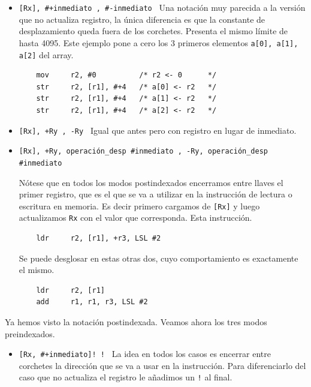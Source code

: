 \begin{descript}
\begin{itemize}
  \item{\tt [Rx], \#+inmediato \newline
            [Rx], \#-inmediato \newline}
    Una notación muy parecida a la versión que no actualiza registro, la única
    diferencia es que la constante de desplazamiento queda fuera de los corchetes.
    Presenta el mismo límite de hasta 4095. Este ejemplo pone a cero los 3 primeros
    elementos {\tt a[0], a[1], a[2]} del array.

\begin{lstlisting}
    mov     r2, #0          /* r2 <- 0      */
    str     r2, [r1], #+4   /* a[0] <- r2   */
    str     r2, [r1], #+4   /* a[1] <- r2   */
    str     r2, [r1], #+4   /* a[2] <- r2   */
\end{lstlisting}

  \item{\tt [Rx], +Ry \newline
            [Rx], -Ry \newline}
    Igual que antes pero con registro en lugar de inmediato.

  \item{\tt [Rx], +Ry, operación\_desp \#inmediato \newline
            [Rx], -Ry, operación\_desp \#inmediato \newline}

    Nótese que en todos los modos postindexados
    encerramos entre llaves el primer registro, que es el que se va
    a utilizar en la instrucción de lectura o escritura en memoria. Es decir
    primero cargamos de {\tt [Rx]} y luego actualizamos {\tt Rx} con el valor
    que corresponda. Esta instrucción.

\begin{lstlisting}
    ldr     r2, [r1], +r3, LSL #2
\end{lstlisting}

    Se puede desglosar en estas otras dos, cuyo comportamiento es exactamente
    el mismo.

\begin{lstlisting}
    ldr     r2, [r1]
    add     r1, r1, r3, LSL #2
\end{lstlisting}
\end{itemize}

    Ya hemos visto la notación postindexada. Veamos ahora los tres modos
    preindexados.

\begin{itemize}
  \item{\tt [Rx, \#+inmediato]! \newline
            [Rx, \#-inmediato]! \newline}
    La idea en todos los casos es encerrar entre corchetes la dirección que
    se va a usar en la instrucción. Para diferenciarlo del caso que no actualiza
    el registro le añadimos un {\tt !} al final.


\end{itemize}
\end{descript}
